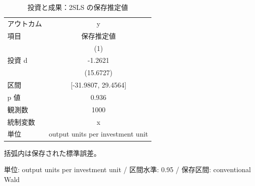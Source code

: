 \begingroup
\begin{table}[htbp]
\centering
\caption{投資と成果：2SLS の保存推定値}
\label{tab:specialist-weak-iv-r01-displays-iv_2sls}
\begin{tabular}{lc}
\toprule
アウトカム & y \\
項目 & 保存推定値 \\
 & (1) \\
\midrule
投資 d & -1.2621 \\
 & (15.6727) \\
区間 & [-31.9807, 29.4564] \\
p 値 & 0.936 \\
\midrule
観測数 & 1000 \\
統制変数 & x \\
単位 & output units per investment unit \\
\bottomrule
\end{tabular}
\par\medskip\begin{minipage}{\linewidth}\footnotesize
括弧内は保存された標準誤差。\par 単位: output units per investment unit / 区間水準: 0.95 / 保存区間: conventional Wald
\end{minipage}
\end{table}
\endgroup
